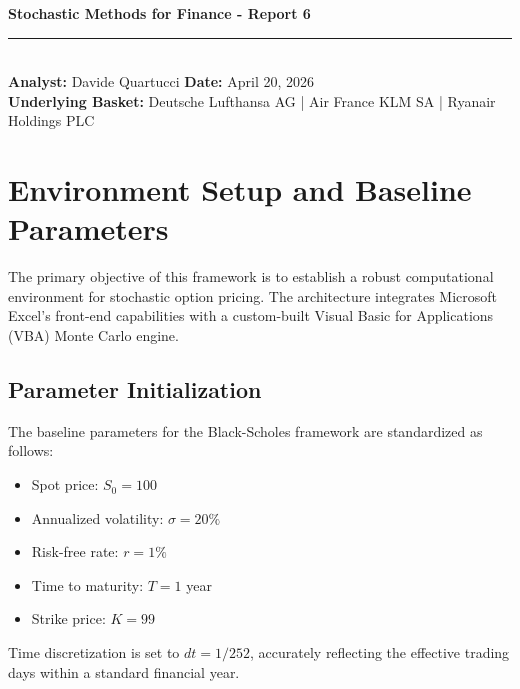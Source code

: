 \documentclass{report}
\begin{document}
\pagestyle{fancy}
\fancyhf{}
\renewcommand{\headrulewidth}{0.4pt}
\setlength{\headheight}{14pt}
\thispagestyle{plain} 

\begin{flushleft}
    {\large \textbf{Stochastic Methods for Finance - Report 6}} \\
    \rule{\textwidth}{0.4pt} \\ 
    \textbf{Analyst:} Davide Quartucci \hfill \textbf{Date:} April 20, 2026 \\
    \textbf{Underlying Basket:} Deutsche Lufthansa AG \;|\; Air France KLM SA \;|\; Ryanair Holdings PLC \\
\end{flushleft}

\begin{center}
\end{center}

\section{Environment Setup and Baseline Parameters}
The primary objective of this framework is to establish a robust computational environment for stochastic option pricing. The architecture integrates Microsoft Excel's front-end capabilities with a custom-built Visual Basic for Applications (VBA) Monte Carlo engine.

\subsection{Parameter Initialization}
The baseline parameters for the Black-Scholes framework are standardized as follows:
\begin{itemize}
    \item Spot price: $S_0 = 100$
    \item Annualized volatility: $\sigma = 20\%$
    \item Risk-free rate: $r = 1\%$
    \item Time to maturity: $T = 1$ year
    \item Strike price: $K = 99$
\end{itemize}
Time discretization is set to $dt = 1/252$, accurately reflecting the effective trading days within a standard financial year.
\end{document}
